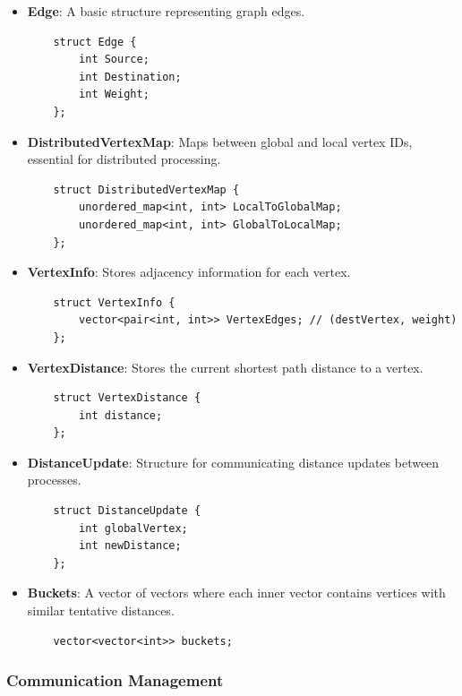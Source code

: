 \documentclass{article}
\begin{document}
\begin{itemize}
    \item \textbf{Edge}: A basic structure representing graph edges.
    \begin{verbatim}
    struct Edge {
        int Source;
        int Destination;
        int Weight;
    };
    \end{verbatim}
    
    \item \textbf{DistributedVertexMap}: Maps between global and local vertex IDs, essential for distributed processing.
    \begin{verbatim}
    struct DistributedVertexMap {
        unordered_map<int, int> LocalToGlobalMap;
        unordered_map<int, int> GlobalToLocalMap;
    };
    \end{verbatim}
    
    \item \textbf{VertexInfo}: Stores adjacency information for each vertex.
    \begin{verbatim}
    struct VertexInfo {
        vector<pair<int, int>> VertexEdges; // (destVertex, weight)
    };
    \end{verbatim}
    
    \item \textbf{VertexDistance}: Stores the current shortest path distance to a vertex.
    \begin{verbatim}
    struct VertexDistance {
        int distance;
    };
    \end{verbatim}
    
    \item \textbf{DistanceUpdate}: Structure for communicating distance updates between processes.
    \begin{verbatim}
    struct DistanceUpdate {
        int globalVertex;
        int newDistance;
    };
    \end{verbatim}
    
    \item \textbf{Buckets}: A vector of vectors where each inner vector contains vertices with similar tentative distances.
    \begin{verbatim}
    vector<vector<int>> buckets;
    \end{verbatim}
\end{itemize}

\subsubsection*{Communication Management}
\end{document}
